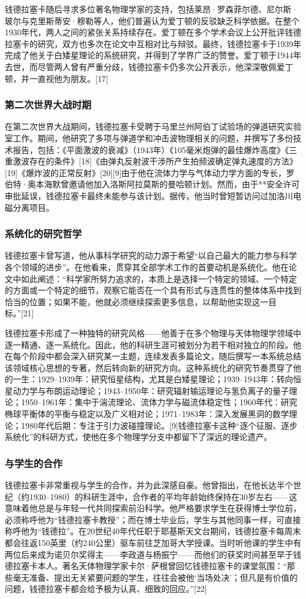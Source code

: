 钱德拉塞卡随后寻求多位著名物理学家的支持，包括莱昂·罗森菲尔德、尼尔斯·玻尔与克里斯蒂安·穆勒等人，他们普遍认为爱丁顿的反驳缺乏科学依据。在整个1930年代，两人之间的紧张关系持续存在。爱丁顿在多个学术会议上公开批评钱德拉塞卡的研究，双方也多次在论文中互相对比与辩驳。最终，钱德拉塞卡于1939年完成了他关于白矮星理论的系统研究，并得到了学界广泛的赞誉。爱丁顿于1944年去世，而尽管两人曾有严重分歧，钱德拉塞卡仍多次公开表示，他深深敬佩爱丁顿，并一直视他为朋友。[17]
\subsubsection{第二次世界大战时期}
在第二次世界大战期间，钱德拉塞卡受聘于马里兰州阿伯丁试验场的弹道研究实验室工作。期间，他研究了多项与弹道学和冲击波物理相关的问题，并撰写了多份技术报告，包括：《平面激波的衰减》（1943年）《105毫米炮弹的最佳爆炸高度》《三重激波存在的条件》[18]《由弹丸反射波干涉所产生拍频波确定弹丸速度的方法》[19]《爆炸波的正常反射》[20][9]由于他在流体力学与气体动力学方面的专长，罗伯特·奥本海默曾邀请他加入洛斯阿拉莫斯的曼哈顿计划。然而，由于**安全许可审批延误，钱德拉塞卡最终未能参与该计划。据传，他当时曾短暂访问过加洛川电磁分离项目。
\subsubsection{系统化的研究哲学}
钱德拉塞卡曾写道，他从事科学研究的动力源于希望“以自己最大的能力参与科学各个领域的进步”。在他看来，贯穿其全部学术工作的首要动机是系统化。他在论文中如此阐述：“科学家所努力追求的，本质上是选择一个特定的领域、一个特定的方面或一个特定的细节，观察它能否在一个具有形式与连贯性的整体体系中找到恰当的位置；如果不能，他就必须继续探索更多信息，以帮助他实现这一目标。”[21]

钱德拉塞卡形成了一种独特的研究风格——他善于在多个物理与天体物理学领域中逐一精通、逐一系统化。因此，他的科研生涯可被划分为若干相对独立的阶段。他在每个阶段中都会深入研究某一主题，连续发表多篇论文，随后撰写一本系统总结该领域核心思想的专著，然后转向新的研究方向。这种系统化的研究节奏贯穿了他的一生：1929–1939年：研究恒星结构，尤其是白矮星理论；1939–1943年：转向恒星动力学与布朗运动理论；1943–1950年：研究辐射输运理论与氢负离子的量子理论；1950–1961年：集中于湍流理论、流体力学与磁流体稳定性；1960年代：研究椭球平衡体的平衡与稳定以及广义相对论；1971–1983年：深入发展黑洞的数学理论；1980年代后期：专注于引力波碰撞理论。[9]钱德拉塞卡这种“逐个征服、逐步系统化”的科研方式，使他在多个物理学分支中都留下了深远的理论遗产。
\subsubsection{与学生的合作}
钱德拉塞卡非常重视与学生的合作，并为此深感自豪。他曾指出，在他长达半个世纪（约1930–1980）的科研生涯中，合作者的平均年龄始终保持在30岁左右——这意味着他总是与年轻一代共同探索前沿科学。他严格要求学生在获得博士学位前，必须称呼他为“钱德拉塞卡教授”；而在博士毕业后，学生与其他同事一样，可直接称呼他为“钱德拉”。在20世纪40年代任职于耶基斯天文台期间，钱德拉塞卡每周末都会往返150英里（约240公里）驱车前往芝加哥大学授课。当时听他课的学生中有两位后来成为诺贝尔奖得主——李政道与杨振宁——而他们的获奖时间甚至早于钱德拉塞卡本人。著名天体物理学家卡尔·萨根曾回忆钱德拉塞卡的课堂氛围：“那些毫无准备、提出无关紧要问题的学生，往往会被他‘当场处决’；但凡是有价值的问题，钱德拉塞卡都会给予极为认真、细致的回应。”[22]
